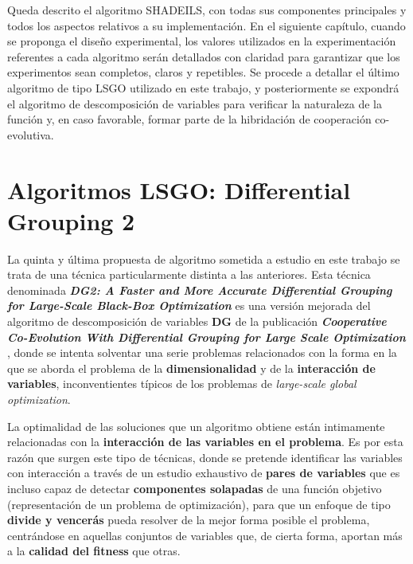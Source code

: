 Queda descrito el algoritmo SHADEILS, con todas sus componentes principales y todos los aspectos relativos a su implementación. En el siguiente capítulo, cuando se proponga el diseño experimental, los valores utilizados en la experimentación referentes a cada algoritmo serán detallados con claridad para garantizar que los experimentos sean completos, claros y repetibles. Se procede a detallar el último algoritmo de tipo LSGO utilizado en este trabajo, y posteriormente se expondrá el algoritmo de descomposición de variables para verificar la naturaleza de la función y, en caso favorable, formar parte de la hibridación de cooperación co-evolutiva.


\section{Algoritmos LSGO: Differential Grouping 2}

La quinta y última propuesta de algoritmo sometida a estudio en este trabajo se trata de una técnica particularmente distinta a las anteriores. Esta técnica denominada \textbf{\textit{DG2: A Faster and More Accurate Differential Grouping for Large-Scale Black-Box Optimization}}\cite{DG2} es una versión mejorada del algoritmo de descomposición de variables \textbf{DG} de la publicación \textbf{\textit{Cooperative Co-Evolution With Differential Grouping for Large Scale Optimization}} \cite{DG}, donde se intenta solventar una serie problemas relacionados con la forma en la que se aborda el problema de la \textbf{dimensionalidad} y de la \textbf{interacción de variables}, inconventientes típicos de los problemas de \textit{large-scale global optimization}.

La optimalidad de las soluciones que un algoritmo obtiene están intimamente relacionadas con la \textbf{interacción de las variables en el problema}. Es por esta razón que surgen este tipo de técnicas, donde se pretende identificar las variables con interacción a través de un estudio exhaustivo de \textbf{pares de variables} que es incluso capaz de detectar \textbf{componentes solapadas} de una función objetivo (representación de un problema de optimización), para que un enfoque de tipo \textbf{divide y vencerás} pueda resolver de la mejor forma posible el problema, centrándose en aquellas conjuntos de variables que, de cierta forma, aportan más a la \textbf{calidad del fitness} que otras.

